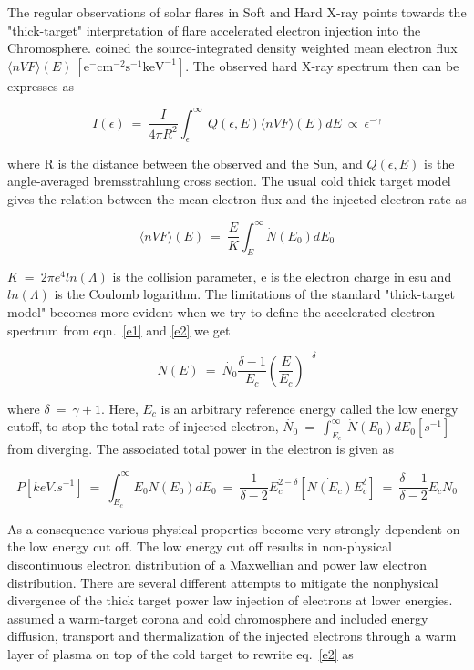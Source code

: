 The regular observations of solar flares in Soft and Hard X-ray points towards the "thick-target" interpretation \citep{brown71} of flare accelerated electron injection into the Chromosphere. \cite{brown_2003} coined the source-integrated density weighted mean electron flux $\langle nVF\rangle(E)~[\mathrm{e^{-}cm^{-2}s^{-1}keV^{-1}}]$. The observed hard X-ray spectrum then can be expresses as

\begin{equation}\label{e1}
    I(\epsilon)~=~\frac{I}{4\pi R^{2}}\int_{\epsilon}^{\infty}~Q(\epsilon,E)\langle nVF\rangle(E)dE~\propto~\epsilon^{-\gamma}
\end{equation}

\noindent where R is the distance between the observed and the Sun, and $Q(\epsilon,E)$ is the angle-averaged bremsstrahlung cross section. The usual cold thick target model gives the relation between the mean electron flux and the injected electron rate as 

\begin{equation}\label{e2}
    \langle nVF\rangle(E)~=~\frac{E}{K}\int_{E}^{\infty}\dot{N}(E_{0})dE_{0}
\end{equation}

\noindent $K~=~2\pi e^{4}ln(\Lambda)$ is the collision parameter, e is the electron charge in esu and $ln(\Lambda)$ is the Coulomb logarithm\citep{spitzer62}. The limitations of the standard "thick-target model" becomes more evident when we try to define the accelerated electron spectrum from eqn.~\ref{e1} and \ref{e2} we get

\begin{equation}
    \dot{N}(E)~=~\dot{N_{0}}\frac{\delta-1}{E_c}\left (\frac{E}{E_c}\right )^{-\delta}
\end{equation}

\noindent where $\delta~=~\gamma+1$. Here, $E_c$ is an arbitrary reference energy called the low energy cutoff, to stop the total rate of injected electron, $\dot{N_0}~=~\int_{E_c}^{\infty}~\dot{N}(E_{0})dE_0[s^{-1}]$ from diverging. The associated total power in the electron is given as

\begin{equation}
    P[keV.s^{-1}]~=~\int_{E_c}^{\infty}E_0N(E_0)dE_0~=~\frac{1}{\delta-2}E_c^{2-\delta}[\dot{N(E_c)}E_c^{\delta}]~=~\frac{\delta-1}{\delta-2}E_c\dot{N_0}
\end{equation}

\noindent As a consequence various physical properties become very strongly dependent on the low energy cut off. The low energy cut off results in non-physical discontinuous electron distribution of a Maxwellian and power law electron distribution. There are several different attempts to mitigate the nonphysical divergence of the thick target power law injection of electrons at lower energies. \cite{kontar15, kontar19} assumed a warm-target corona and cold chromosphere and included energy diffusion, transport and thermalization of the injected electrons through a warm layer of plasma on top of the cold target to rewrite eq.~\ref{e2} as

